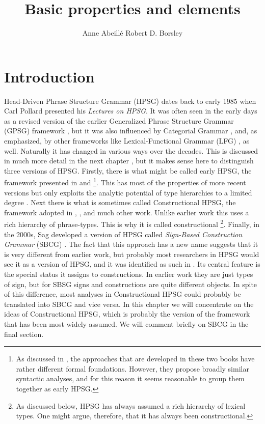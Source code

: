 \documentclass[output=paper
	        ,collection
	        ,collectionchapter
 	        ,biblatex
                ,babelshorthands
                ,newtxmath
                ,draftmode
                ,colorlinks, citecolor=brown
]{langscibook}
\title{Basic properties and elements}
\author{%
 Anne Abeillé\affiliation{Université Paris Diderot}%
 \lastand Robert D. Borsley\affiliation{University of Essex}%
}
\begin{document}
\maketitle
\label{chapter-basic-properties}\label{chap-properties}


\section{Introduction}\label{sec:prop1}
\label{prop:sec-intro}

Head-Driven Phrase Structure Grammar (HPSG) dates back to early 1985 when Carl Pollard presented his \emph{Lectures on HPSG}. It was often seen in the early days as a revised version of the earlier Generalized Phrase Structure Grammar (GPSG) framework \citep*{GKPS85a}, but it was also influenced by Categorial Grammar \citep{Ajdukiewicz35a-u,Steedman2000a-u}, and, as \citet[1]{ps} emphasized, by other frameworks like Lexical-Functional Grammar (LFG) \citep{Bresnan82a-ed}, as well. Naturally it has changed in various ways over the decades. This is discussed in much more detail in the next chapter , but it makes sense here to distinguish three versions of HPSG. Firstly, there is what might be called early HPSG, the framework presented in \citet{ps} and \citet{ps2}%
%
\footnote{As discussed in , the approaches that are developed in these two books have rather different formal foundations. However, they propose broadly similar syntactic analyses, and for this reason it seems reasonable to group them together as early HPSG.}.
%
This has most of the properties of more recent versions but only exploits the analytic potential of type hierarchies to a limited degree \citep*{Flickinger87,FPW85a}. Next there is what is sometimes called Constructional HPSG, the framework adopted in , , and much other work. Unlike earlier work this uses a rich hierarchy of phrase-types. This is why it is called constructional%
%
\footnote{As discussed below, HPSG has always assumed a rich hierarchy of lexical types. One might argue, therefore, that it has always been constructional.}.
%
Finally, in the 2000s, Sag developed a version of HPSG called \emph{Sign-Based Construction Grammar} (SBCG) \citep{Sag2012a}. The fact that this approach has a new name suggests that it is very different from earlier work, but probably most researchers in HPSG would see it as a version of HPSG, and it was identified as such in \citet[486]{Sag2010b}. Its central feature is the special status it assigns to constructions. In earlier work they are just types of sign, but for SBSG signs and constructions are quite different objects. In spite of this difference, most analyses in Constructional HPSG could probably be translated into SBCG and vice versa. In this chapter we will concentrate on the ideas of Constructional HPSG, which is probably the version of the framework that has been most widely assumed. We will comment briefly on SBCG in the final section.
\end{document}
